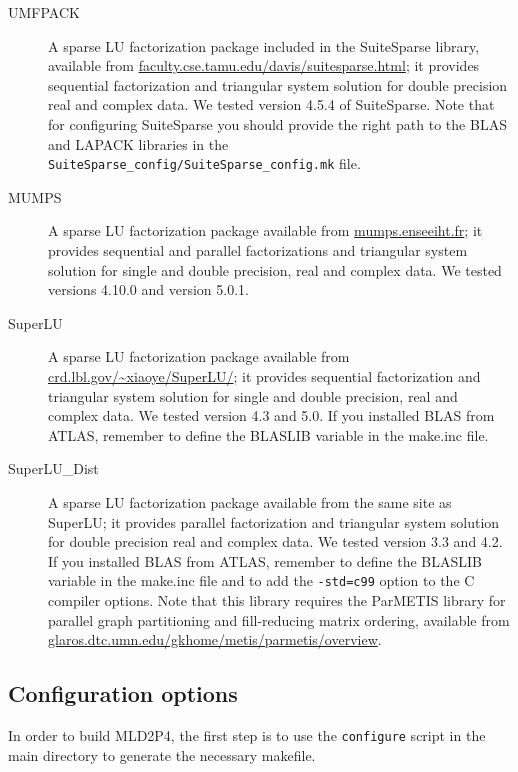 \begin{description}
\item[UMFPACK] \cite{UMFPACK}
  A sparse LU factorization package included in the SuiteSparse library, available from 
  \url{faculty.cse.tamu.edu/davis/suitesparse.html}; 
  it provides sequential factorization and triangular system solution for double
  precision real and complex data. We tested version 4.5.4 of SuiteSparse.
  Note that for configuring SuiteSparse you should provide the right path to the BLAS
  and LAPACK libraries in the \verb|SuiteSparse_config/SuiteSparse_config.mk| file.
\item[MUMPS] \cite{MUMPS}
  A sparse LU factorization package available from \url{mumps.enseeiht.fr};
  it provides sequential and parallel factorizations and triangular system solution
  for single and double precision, real and complex data.
  We tested versions 4.10.0 and version 5.0.1.
\item[SuperLU] \cite{SUPERLU}
  A sparse LU factorization package available from
  \url{crd.lbl.gov/~xiaoye/SuperLU/}; it provides sequential
  factorization and triangular system solution for single and double precision,
  real and complex data. We tested version 4.3 and 5.0. If you installed BLAS from
  ATLAS, remember to define the BLASLIB variable in the make.inc file.
 \item[SuperLU\_Dist] \cite{SUPERLUDIST}
   A sparse LU factorization package available
   from the same site as SuperLU; it provides parallel factorization and
   triangular system solution for double precision real and complex data.
   We tested version 3.3 and 4.2. If you installed BLAS from
   ATLAS, remember to define the BLASLIB variable in the make.inc file and
   to add the \verb|-std=c99| option to the C compiler options.
   Note that this library requires the ParMETIS
   library for parallel graph partitioning and fill-reducing matrix ordering, available from
   \url{glaros.dtc.umn.edu/gkhome/metis/parmetis/overview}.
\end{description}

\subsection{Configuration options}

In order to build MLD2P4, the first step is to use the \verb|configure| script
in the main directory to generate the necessary makefile.

